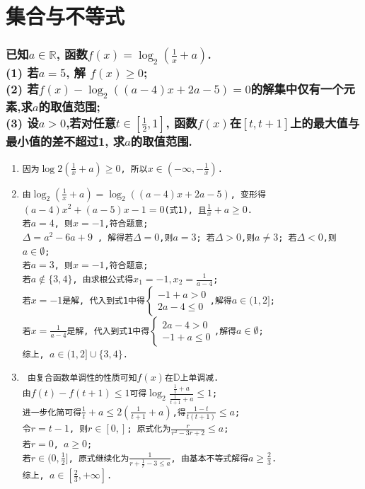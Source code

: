 \documentclass{article}
\newcommand{\1}{\underline{\makebox[1cm]{}}}
\newcommand{\2}{\underline{\makebox[2cm]{}}}
\newcommand{\3}{\underline{\makebox[3cm]{}}}
\newcommand{\4}{\underline{\makebox[4cm]{}}}
\newcommand{\lge}{\large \texttt}
\newlength{\la}
\begin{document}
\newpage
\part{集合与不等式}

\section{
    已知$a \in \mathbb{R}$, 函数$f(x)= \log_2{(\frac{1}{x}+a)}$. 
\\(1) 若$a = 5$, 解 $f(x) \geq 0$;
\\(2) 若$f(x) - \log_2{((a-4)x +2a -5)} = 0$的解集中仅有一个元素,求$a$的取值范围;
\\(3) 设$a > 0$,若对任意$t \in [\frac{1}{2}, 1]$, 函数$f(x)$在$[t, t + 1]$上的最大值与最小值的差不超过1, 求$a$的取值范围.
}
\begin{enumerate}[(1)]
    \item \lge{因为$\log{2}{(\frac{1}{x}+a)} \geq 0$, 所以$x \in (- \infty, -\frac{1}{x}) $.}
    \item \lge{由$\log_2{(\frac{1}{x}+a)} = \log_2{((a - 4)x + 2a - 5)}$, 变形得$(a-4)x^2 + (a-5)x - 1 = 0$(式1), 且$\frac{1}{x} + a \geq 0$.
        \\若$ a = 4 $, 则$ x = -1$,符合题意;
        \\ $\Delta = a^2 - 6a + 9$ , 解得若$\Delta = 0$,则$a = 3$; 若$\Delta > 0$,则$a \neq 3$; 若$\Delta < 0$,则 $a \in \emptyset$;
        \\若$a = 3$, 则$x = -1$,符合题意;
        \\若$a \notin \{3, 4\}$, 由求根公式得$x_1 = -1, x_2 = \frac{1}{a-4}$;
        \\若$x = -1$是解, 代入到式1中得$\begin{cases} -1 + a > 0 \\ 2a - 4 \leq 0\end{cases}$,解得$a \in (1, 2]$;
        \\若$x = \frac{1}{a-4}$是解, 代入到式1中得$\begin{cases} 2a - 4 > 0 \\ -1 + a \leq0\end{cases}$,解得$a \in \emptyset$;
        \\综上, $a \in (1, 2]\cup \{3,4\}$.
    }
    \item \lge{
        由复合函数单调性的性质可知$f(x)$在$\mathbb{D}$上单调减.
        \\由$f(t)-f(t+1) \leq 1$可得$\log_2{\frac{\frac{1}{t}+a}{\frac{1}{t+1}+a}} \leq 1$;
        \\进一步化简可得$\frac{1}{t} + a \leq 2(\frac{1}{t+1}+a)$,得$\frac{1 - t}{t(t+1)} \leq a$;
        \\令$r = t -1$, 则$r \in [0, ]$; 原式化为$\frac{r}{r^2 - 3r + 2} \leq a$;
        \\若$r = 0$, $a \geq 0$;
        \\若$r \in (0, \frac{1}{2}]$, 原式继续化为$\frac{1}{r+\frac{1}{r}-3 \leq a}$, 由基本不等式解得$a \geq \frac{2}{3}$.
        \\综上, $a \in [\frac{2}{3}, +\infty]$.
    }
    
            

    \end{enumerate}
\end{document}
